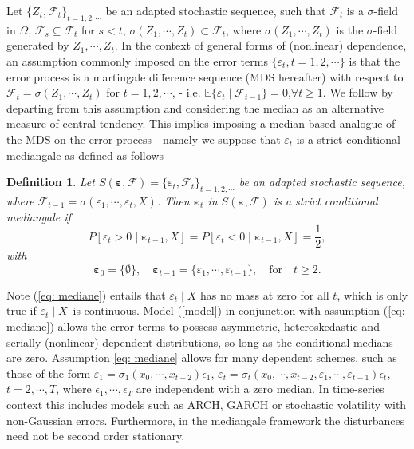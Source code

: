\documentclass[harvard,11pt]{article}
\newcommand{\E}{\mathbb{E}}
\newtheorem{definition}{Definition}
\begin{document}
 Let $\{Z_t,\mathcal{F}_t\}_{t=1,2,\cdots}$ be an adapted stochastic sequence, such that $\mathcal{F}_t$ is a $\sigma$-field in $\Omega$, $\mathcal{F}_s\subseteq \mathcal{F}_t$ for $s< t$, $\sigma(Z_1,\cdots,Z_t)\subset \mathcal{F}_t$, where $\sigma(Z_1,\cdots,Z_t)$ is the $\sigma$-field generated by $Z_1,\cdots,Z_t$. In the context of general forms of (nonlinear) dependence, an assumption commonly imposed on the error terms $\{\varepsilon_t,t=1,2,\cdots\}$ is that the error process is a martingale difference sequence (MDS hereafter) with respect to $\mathcal{F}_t=\sigma(Z_1,\cdots,Z_t)$ for $t=1,2,\cdots$, - i.e. $\E\{\varepsilon_t\mid \mathcal{F}_{t-1}\}=0$,\quad $\forall t\geq1$. We follow \citet{coudin2009finite} by departing from this assumption and considering the median as an alternative measure of central tendency. This implies imposing a median-based analogue of the MDS on the error process - namely we suppose that $\varepsilon_t$ is a strict conditional mediangale as defined as follows
\begin{definition}
Let $S(\bm{\varepsilon},\mathcal{F})=\{\varepsilon_t,\mathcal{F}_{t}\}_{t=1,2,\cdots}$ be an adapted stochastic sequence, where $\mathcal{F}_{t-1}=\sigma(\varepsilon_1,\cdots,\varepsilon_t,X)$. Then $\bm{\varepsilon}_t$ in $S(\bm{\varepsilon},\mathcal{F})$ is a strict conditional mediangale if
\begin{equation}
P[\varepsilon_{t}> 0\mid \bm{{\varepsilon}}_{t-1},X]=P[\varepsilon_{t}<0\mid \bm{\varepsilon}_{t-1},X]=\frac{1}{2},
\label{eq: mediane}
\end{equation}%
with
\[
\bm{\varepsilon}_{0}=\{\emptyset\},\quad\bm{\varepsilon}_{t-1}=\{\varepsilon_1,\cdots,\varepsilon_{t-1}\},\quad\text{for}\quad t\geq2.
\]
\end{definition}

 Note (\ref{eq: mediane}) entails that $\varepsilon _{t}\mid X$ has no mass at zero for all $t$, which is only true if $\varepsilon_{t}\mid X$\ is continuous. Model (\ref{model}) in conjunction with assumption (\ref{eq: mediane}) allows the error terms to possess asymmetric, heteroskedastic and serially (nonlinear) dependent distributions, so long as the conditional medians are zero. Assumption \ref{eq: mediane} allows for many dependent schemes, such as those of the form $\varepsilon_1=\sigma_1(x_0,\cdots,x_{t-2})\epsilon_1$, $\varepsilon_t=\sigma_t(x_0,\cdots,x_{t-2},\varepsilon_1,\cdots,\varepsilon_{t-1})\epsilon_t$, $t=2,\cdots,T$, where $\epsilon_1,\cdots,\epsilon_T$ are independent with a zero median. In time-series context this includes models such as ARCH, GARCH or stochastic volatility with non-Gaussian errors. Furthermore, in the mediangale framework the disturbances need not be second order stationary.
 
\end{document}
